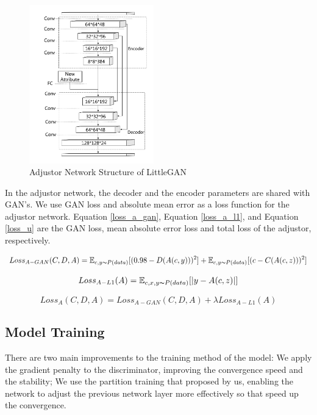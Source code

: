 \begin{figure}
    \begin{center}
    \includegraphics[width=0.48\textwidth]{figures/net_adjustor.pdf}
    \caption{Adjustor Network Structure of LittleGAN}
    \label{net_adjustor}
    \end{center}
\end{figure}

In the adjustor network, the decoder and the encoder parameters are shared with GAN's.
We use GAN loss and absolute mean error as a loss function for the adjustor network.
Equation \eqref{loss_a_gan}, Equation \eqref{loss_a_l1}, and Equation \eqref{loss_u} are the GAN loss,
    mean absolute error loss and total loss of the adjustor, respectively.

\begin{equation}
    Loss_{A-GAN}(C,D,A)=
    \mathbb{E}_{c,y\thicksim P(data)}[(0.98-D(A(c,y)))^2]+
    \mathbb{E}_{c,y\thicksim P(data)}[(c-C(A(c,z)))^2]
    \label{loss_a_gan}
\end{equation}

\begin{equation}
    Loss_{A-L1}(A)=
    \mathbb{E}_{c,x,y\thicksim P(data)}[|y-A(c,z)|]
    \label{loss_a_l1}
\end{equation}

\begin{equation}
    Loss_{A}(C,D,A)=
    Loss_{A-GAN}(C,D,A)+
    \lambda Loss_{A-L1}(A)
    \label{loss_u}
\end{equation}

\subsection{Model Training}%
There are two main improvements to the training method of the model:
    We apply the gradient penalty to the discriminator, improving the convergence speed and the stability;
    We use the partition training that proposed by us,
    enabling the network to adjust the previous network layer more effectively
    so that speed up the convergence.

